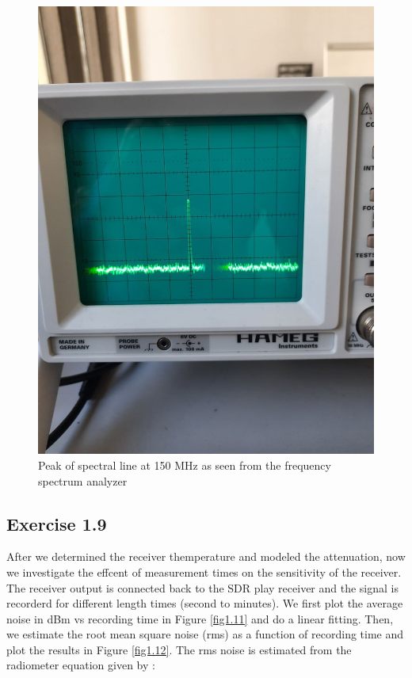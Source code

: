 \documentclass[12pt]{article}
\begin{document}
\begin{figure}[H]
\centering
\includegraphics[scale=.2]{fig/Exercise 1.8.jpg}
\caption{Peak of spectral line at 150 MHz as seen from the frequency spectrum analyzer}
\label{fig1.10}
\end{figure}

\subsection{Exercise 1.9}
After we determined the receiver themperature and modeled the attenuation, now we investigate the effcent of measurement times on the sensitivity of the receiver. 
The receiver output is connected back to the SDR play receiver and the signal is recorderd for different length times (second to minutes). We first plot the average noise in dBm vs recording time in Figure \ref{fig1.11} and do a linear fitting. Then, we estimate the root mean square noise (rms) as a function of recording time and plot the results in Figure \ref{fig1.12}. The rms noise is estimated from the radiometer equation given by \cite{klein}:
\end{document}
